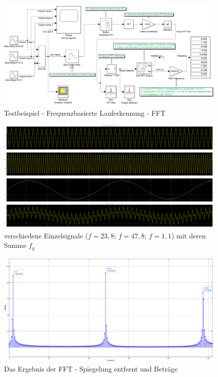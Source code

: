\begin{landscape}
	\begin{figure}[H]
		\centering
		\includegraphics[width=\linewidth]{Bilder/Lauferkennung_FFT_Testmodell1.png}
		\caption{Testbeispiel - Frequenzbasierte Lauferkennung - FFT}
		\label{fig:Lauferkennung_Freqbasiert_FFT_Testmodell}
	\end{figure}
\end{landscape}

\begin{figure}[H] %
	\centering
	\includegraphics[width=\linewidth]{Bilder/Testsignal_AllViews.png}
	\caption{verschiedene Einzelsignale ($f=23,8$; $f=47,8$; $f=1,1$) mit deren Summe $f_g$}
	\label{fig:Testsignal_AllViews}
\end{figure}

\begin{figure}[H]
	\centering
	\includegraphics[width=\linewidth]{Bilder/FFT_Ergebnis_Skala_512.png}
	\caption{Das Ergebnis der FFT - Spiegelung entfernt und Beträge}
	\label{fig:FFT_Ergebnis_Skala_512}
\end{figure}

